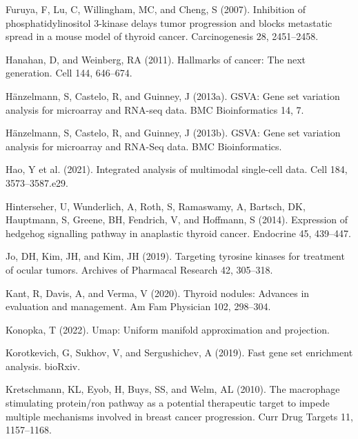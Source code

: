 \documentclass[
  parskip,
  oneside]{scrreprt}
\newlength{\cslhangindent}
\newlength{\cslentryspacingunit} %
\newenvironment{CSLReferences}[2] %
 {%
  \setlength{\parindent}{0pt}
  \ifodd #1
  \let\oldpar\par
  \def\par{\hangindent=\cslhangindent\oldpar}
  \fi
  \setlength{\parskip}{#2\cslentryspacingunit}
 }%
 {}
\begin{document}
\begin{CSLReferences}{0}{0}
\leavevmode{}%
Furuya, F, Lu, C, Willingham, MC, and Cheng, S (2007). Inhibition of
phosphatidylinositol 3-kinase delays tumor progression and blocks
metastatic spread in a mouse model of thyroid cancer. Carcinogenesis 28,
2451--2458.

\leavevmode{}%
Hanahan, D, and Weinberg, RA (2011). Hallmarks of cancer: The next
generation. Cell 144, 646--674.

\leavevmode{}%
Hänzelmann, S, Castelo, R, and Guinney, J (2013a). GSVA: Gene set
variation analysis for microarray and RNA-seq data. BMC Bioinformatics
14, 7.

\leavevmode{}%
Hänzelmann, S, Castelo, R, and Guinney, J (2013b). {GSVA}: Gene set
variation analysis for microarray and {RNA-Seq} data. BMC
Bioinformatics.

\leavevmode{}%
Hao, Y et al. (2021). Integrated analysis of multimodal single-cell
data. Cell 184, 3573--3587.e29.

\leavevmode{}%
Hinterseher, U, Wunderlich, A, Roth, S, Ramaswamy, A, Bartsch, DK,
Hauptmann, S, Greene, BH, Fendrich, V, and Hoffmann, S (2014).
Expression of hedgehog signalling pathway in anaplastic thyroid cancer.
Endocrine 45, 439--447.

\leavevmode{}%
Jo, DH, Kim, JH, and Kim, JH (2019). Targeting tyrosine kinases for
treatment of ocular tumors. Archives of Pharmacal Research 42, 305--318.

\leavevmode{}%
Kant, R, Davis, A, and Verma, V (2020). Thyroid nodules: Advances in
evaluation and management. Am Fam Physician 102, 298--304.

\leavevmode{}%
Konopka, T (2022). Umap: Uniform manifold approximation and projection.

\leavevmode{}%
Korotkevich, G, Sukhov, V, and Sergushichev, A (2019). Fast gene set
enrichment analysis. bioRxiv.

\leavevmode{}%
Kretschmann, KL, Eyob, H, Buys, SS, and Welm, AL (2010). The macrophage
stimulating protein/ron pathway as a potential therapeutic target to
impede multiple mechanisms involved in breast cancer progression. Curr
Drug Targets 11, 1157--1168.


\end{CSLReferences}
\end{document}
